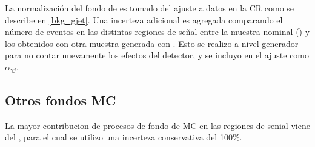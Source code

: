 La normalización del fondo de {\gjet} es tomado del ajuste a datos en la CR
como se describe en \cref{bkg_gjet}. Una incerteza adicional es agregada comparando el
número de eventos en las distintas regiones de señal entre la muestra nominal
(\sherpa) y los obtenidos con otra muestra generada con {\pythia}.
Esto se realizo a nivel generador para no contar nuevamente los efectos del
detector, y se incluyo en el ajuste como $\alpha_{\gamma j}$.


\subsection{Otros fondos MC}

La mayor contribucion de procesos de fondo de MC en las regiones de senial viene
del {\zgam}, para el cual se utilizo una incerteza conservativa del 100\%.






